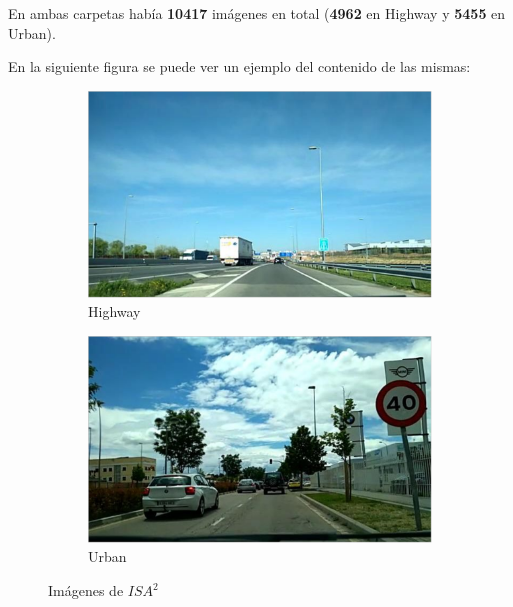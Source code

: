 En ambas carpetas había \textbf{10417} imágenes en total (\textbf{4962} en Highway y \textbf{5455} en Urban).

En la siguiente figura se puede ver un ejemplo del contenido de las mismas:

\begin{figure}[H]
  \centering
  \begin{subfigure}[b]{0.45\linewidth}
    \includegraphics[width=\linewidth]{Figuras/Ejemplo_Highway.eps}
    \caption{Highway}
  \end{subfigure}
    \begin{subfigure}[b]{0.45\linewidth}
    \includegraphics[width=\linewidth]{Figuras/Ejemplo_Urban.eps}
    \caption{Urban}
  \end{subfigure}
  \caption{Imágenes de $ISA^{2}$}
  \label{fig:HyU}
\end{figure}


